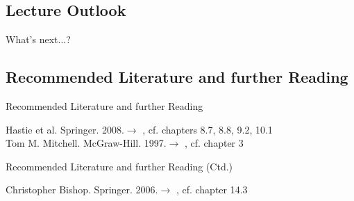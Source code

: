 \subsection{Lecture Outlook}

\begin{frame}{What's next...?}{}
\end{frame}


\subsection{Recommended Literature and further Reading}

\begin{frame}{Recommended Literature and further Reading}{}
	\footnotesize
	\begin{thebibliography}{2}
			{Hastie et al. Springer. 2008.}{$\rightarrow$ \href{
				https://web.stanford.edu/~hastie/Papers/ESLII.pdf
			}{}, cf. chapters 8.7, 8.8, 9.2, 10.1}\\
			{Tom M. Mitchell. McGraw-Hill. 1997.}{$\rightarrow$ \href{
				https://www.cs.ubbcluj.ro/~gabis/ml/ml-books/McGrawHill%
			}{}, cf. chapter 3}\\
	\end{thebibliography}
\end{frame}

\begin{frame}{Recommended Literature and further Reading (Ctd.)}{}
	\footnotesize
	\begin{thebibliography}{2}
			{Christopher Bishop. Springer. 2006.}{$\rightarrow$ \href{
				http://users.isr.ist.utl.pt/~wurmd/Livros/school/Bishop\%20-\%20Pattern\%20Recognition\%20And\%20Machine\%20Learning\%20-\%20Springer\%20\%202006.pdf
			}{}, cf. chapter 14.3}
	\end{thebibliography}
\end{frame}


